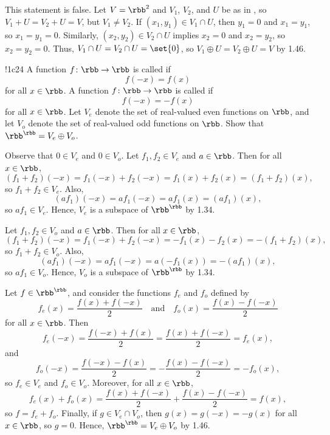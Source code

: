 \begin{sol}
    This statement is false.
    Let $V = \rbb^2$ and $V_1$, $V_2$, and $U$ be as in , so $V_1 + U = V_2 + U = V$, but $V_1 \neq V_2$.
    If $(x_1, y_1) \in V_1 \cap U$, then $y_1 = 0$ and $x_1 = y_1$, so $x_1 = y_1 = 0$.
    Similarly, $(x_2, y_2) \in V_2 \cap U$ implies $x_2 = 0$ and $x_2 = y_2$, so $x_2 = y_2 = 0$.
    Thus, $V_1 \cap U = V_2 \cap U = \set{0}$, so $V_1 \oplus U = V_2 \oplus U = V$ by 1.46.
\end{sol}

\begin{exercise}!{1c24}
    A function $f \colon \rbb \to \rbb$ is called  if
    \[
    	f(-x) = f(x)
    \]
    for all $x \in \rbb$.
	A function $f \colon \rbb \to \rbb$ is called  if
    \[
    	f(-x) = -f(x)
    \]
    for all $x \in \rbb$.
	Let $V_e$ denote the set of real-valued even functions on $\rbb$, and let $V_o$ denote the set of real-valued odd functions on $\rbb$.
	Show that $\rbb^{\rbb} = V_e \oplus V_o$.

\end{exercise}

\begin{sol}
    Observe that $0 \in V_e$ and $0 \in V_o$.
    Let $f_1, f_2 \in V_e$ and $a \in \rbb$.
    Then for all $x \in \rbb$,
    \[
        (f_1 + f_2)(-x) = f_1(-x) + f_2(-x) = f_1(x) + f_2(x) = (f_1 + f_2)(x),
    \]
    so $f_1 + f_2 \in V_e$.
    Also,
    \[
        (a f_1)(-x) = a f_1(-x) = a f_1(x) = (a f_1)(x),
    \]
    so $a f_1 \in V_e$.
    Hence, $V_e$ is a subspace of $\rbb^{\rbb}$ by 1.34.

    Let $f_1, f_2 \in V_o$ and $a \in \rbb$.
    Then for all $x \in \rbb$,
    \[
        (f_1 + f_2)(-x) = f_1(-x) + f_2(-x) = -f_1(x) - f_2(x) = -(f_1 + f_2)(x),
    \]
    so $f_1 + f_2 \in V_o$.
    Also,
    \[
        (a f_1)(-x) = a f_1(-x) = a (-f_1(x)) = -(a f_1)(x),
    \]
    so $a f_1 \in V_o$.
    Hence, $V_o$ is a subspace of $\rbb^{\rbb}$ by 1.34.

    Let $f \in \rbb^{\rbb}$, and consider the functions $f_e$ and $f_o$ defined by
    \[
        f_e(x) = \frac{f(x) + f(-x)}{2} \quad \text{and} \quad f_o(x) = \frac{f(x) - f(-x)}{2}
    \]
    for all $x \in \rbb$.
    Then
    \[
        f_e(-x) = \frac{f(-x) + f(x)}{2} = \frac{f(x) + f(-x)}{2} = f_e(x),
    \]
    and
    \[
        f_o(-x) = \frac{f(-x) - f(x)}{2} = -\frac{f(x) - f(-x)}{2} = -f_o(x),
    \]
    so $f_e \in V_e$ and $f_o \in V_o$.
    Moreover, for all $x \in \rbb$,
    \[
        f_e(x) + f_o(x) = \frac{f(x) + f(-x)}{2} + \frac{f(x) - f(-x)}{2} = f(x),
    \]
    so $f = f_e + f_o$.
    Finally, if $g \in V_e \cap V_o$, then $g(x) = g(-x) = -g(x)$ for all $x \in \rbb$, so $g = 0$.
    Hence, $\rbb^{\rbb} = V_e \oplus V_o$ by 1.46.
\end{sol}